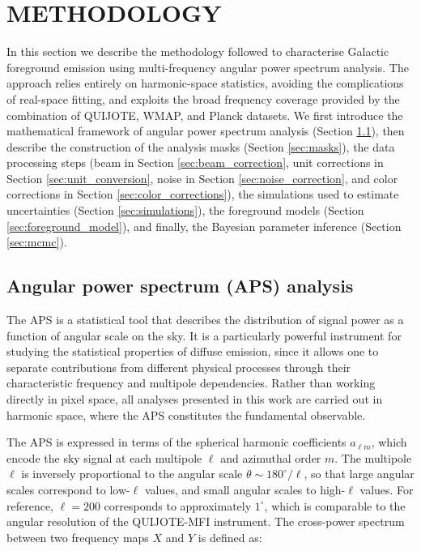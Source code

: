 \section{METHODOLOGY}
\label{sec:methodology}

In this section we describe the methodology followed to characterise Galactic foreground emission using multi-frequency angular power spectrum analysis. The approach relies entirely on harmonic-space statistics, avoiding the complications of real-space fitting, and exploits the broad frequency coverage provided by the combination of QUIJOTE, WMAP, and Planck datasets. We first introduce the mathematical framework of angular power spectrum analysis (Section \ref{sec:power_spectrum}), then describe the construction of the analysis masks (Section \ref{sec:masks}), the data processing steps (beam in Section \ref{sec:beam_correction}, unit corrections in Section \ref{sec:unit_conversion}, noise in Section \ref{sec:noise_correction}, and color corrections in Section \ref{sec:color_corrections}), the simulations used to estimate uncertainties (Section \ref{sec:simulations}), the foreground models (Section \ref{sec:foreground_model}), and finally, the Bayesian parameter inference (Section \ref{sec:mcmc}).

\subsection{Angular power spectrum (APS) analysis}
\label{sec:power_spectrum}

The APS is a statistical tool that describes the distribution of signal power as a function of angular scale on the sky. It is a particularly powerful instrument for studying the statistical properties of diffuse emission, since it allows one to separate contributions from different physical processes through their characteristic frequency and multipole dependencies. Rather than working directly in pixel space, all analyses presented in this work are carried out in harmonic space, where the APS constitutes the fundamental observable.

The APS is expressed in terms of the spherical harmonic coefficients $a_{\ell m}$, which encode the sky signal at each multipole $\ell$ and azimuthal order $m$. The multipole $\ell$ is inversely proportional to the angular scale $\theta \sim 180^\circ / \ell$, so that large angular scales correspond to low-$\ell$ values, and small angular scales to high-$\ell$ values. For reference, $\ell = 200$ corresponds to approximately $1^\circ$, which is comparable to the angular resolution of the QUIJOTE-MFI instrument. The cross-power spectrum between two frequency maps $X$ and $Y$ is defined as:


